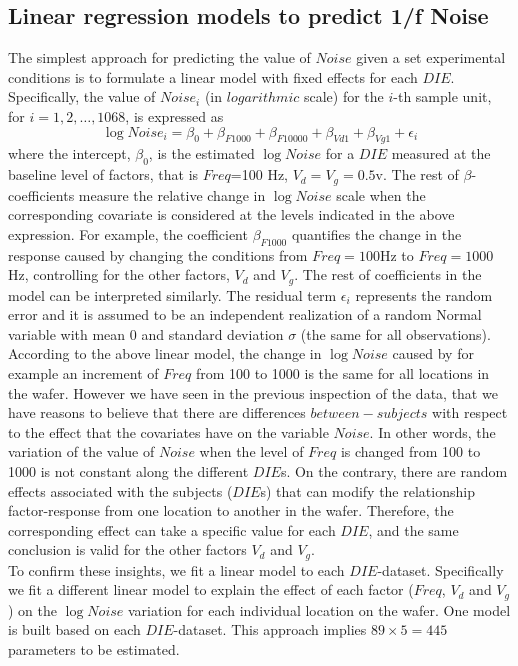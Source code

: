 \documentclass[sn-mathphys]{sn-jnl}%
\theoremstyle{thmstyleone}%
\theoremstyle{thmstyletwo}%
\theoremstyle{thmstylethree}%
\begin{document}
\subsection{Linear regression models to predict 1/f Noise}
\label{sec:linear_model}
\noindent The simplest approach for predicting the value of $Noise$ given a set experimental conditions is to formulate a linear model with fixed effects for each $DIE$. Specifically, the value of $Noise_i$ (in $logarithmic$ scale) for the $i$-th sample unit, for $i=1,2,\ldots, 1068$, is expressed as 
\[
\log Noise_i  =\beta_0+\beta_{F1000}+\beta_{F10000} +\beta_{Vd1}+\beta_{Vg1}+\epsilon_i 
\]
where the intercept, $\beta_0$,  is the estimated $\log Noise$ for a $DIE$ measured at the baseline level of factors, that is $Freq$=100 Hz, $V_d=V_g=0.5$v. The rest of $\beta$-coefficients measure the relative change in $\log Noise$ scale when the corresponding covariate is considered at the levels indicated in the above expression.  For example, the coefficient $\beta_{F1000}$ quantifies the change in the response caused by changing the conditions from $Freq=100$Hz to $Freq=1000$Hz, controlling for the other factors, $V_d$ and $V_g$. The rest of coefficients in the model can be interpreted similarly.
The residual term $\epsilon_i$ represents the random error and it is assumed to be an independent realization of a random Normal variable  with mean 0 and standard deviation $\sigma$ (the same for all observations).\\

According to the above linear model, the change in $\log Noise$ caused by for example an increment of $Freq$ from 100 to 1000 is the same for all locations in the wafer. However we have seen in the previous inspection of the data, that we have reasons to believe that there are differences $between-subjects$ with respect to the effect that the covariates have on the variable $Noise$. In other words,  the variation of the value of $Noise$ when the level of $Freq$ is changed from 100 to 1000 is not constant along the different $DIE$s. On the contrary, there are random effects associated with the subjects ($DIE$s) that can modify the relationship factor-response from one location to another in the wafer. Therefore, the corresponding effect can take a specific value for each $DIE$, and the same conclusion is valid for the other factors $V_d$ and $V_g$.\\ 

To confirm these insights, we fit a linear model to each $DIE$-dataset. Specifically we fit a different linear model to explain the effect of each factor ($Freq$, $V_d$ and $V_g$) on the $\log Noise$ variation for each individual location on the wafer. One model  is built based on each $DIE$-dataset. This approach implies $89 \times 5=445$ parameters to be estimated. \\
\end{document}
